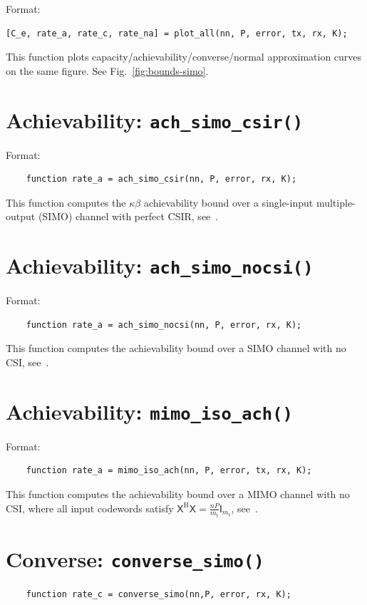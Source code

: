\documentclass[a4paper,11p]{memoir}
\def\txant{m_{\mathrm{t}}} %
\def\bl{n} %
\begin{document}
Format:
\begin{verbatim}
[C_e, rate_a, rate_c, rate_na] = plot_all(nn, P, error, tx, rx, K);
\end{verbatim}

This function plots capacity/achievability/converse/normal approximation curves on the same figure. See Fig.~\ref{fig:bounds-simo}.


\section{Achievability: \texttt{ach\_simo\_csir()}}

Format:
\begin{verbatim}
	function rate_a = ach_simo_csir(nn, P, error, rx, K);
\end{verbatim}

This function computes the $\kappa\beta$ achievability bound over a single-input multiple-output (SIMO) channel with perfect CSIR, see~\cite[Footnote~7]{yang14-07a}.

\section{Achievability: \texttt{ach\_simo\_nocsi()} }
Format:
\begin{verbatim}
	function rate_a = ach_simo_nocsi(nn, P, error, rx, K);
\end{verbatim}

This function computes the achievability bound over a SIMO channel with no CSI, see~\cite[Eq.~(67)]{yang14-07a}. 

\section{Achievability: \texttt{mimo\_iso\_ach()}}
Format:
\begin{verbatim}
	function rate_a = mimo_iso_ach(nn, P, error, tx, rx, K);
\end{verbatim}

This function computes the achievability bound over a MIMO channel with no CSI, where all input codewords satisfy $\mathsf{X}^{\mathrm{H}}\mathsf{X} = \frac{\bl P}{\txant}\mathsf{I}_{\txant}$, see~\cite[Eq.~(65)]{yang14-07a}. 

\section{Converse: \texttt{converse\_simo()}}
\begin{verbatim}
	function rate_c = converse_simo(nn,P, error, rx, K);
\end{verbatim}
\end{document}
